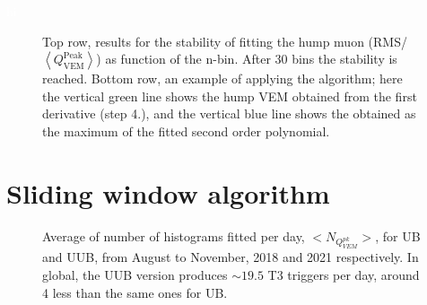 \documentclass[twoside, final, 10pt]{articleMine}
\begin{document}
\textcolor{white}{hi}
\begin{figure}[!t]
  \centering
  \caption{Top row, results for the stability of fitting the hump
  muon (RMS/$\left<Q^\mathrm{Peak}_\mathrm{VEM}\right>$) as
  function of the n-bin. After 30 bins the stability is reached.
  Bottom row, an example of applying the algorithm; here the
  vertical green line shows the hump VEM obtained from the first
  derivative (step 4.), and the vertical blue line shows the
  \qpkvem obtained as the maximum of the fitted second order
  polynomial.}
  \label{figApplyingAlgorithm}
\end{figure}
\newpage

\section{Sliding window algorithm}
\label{secSlidWindowAlgo}
\begin{figure}[!t]
  \centering
  \caption{Average of number of histograms fitted per day,
  $< N_{Q^{pk}_{VEM}}>$, for UB and UUB, from August
  to November, 2018 and 2021 respectively. In global, the UUB
  version produces $\sim19.5$ T3 triggers per day, around 4 less
  than the same ones for UB.}
  \label{figDistDiffAveQpkDayPmts}
\end{figure}
\end{document}
